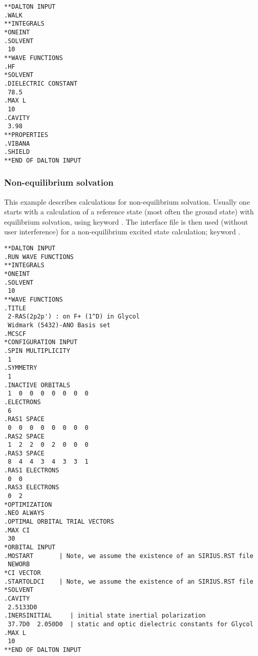 \begin{verbatim}
**DALTON INPUT
.WALK
**INTEGRALS
*ONEINT
.SOLVENT
 10
**WAVE FUNCTIONS
.HF
*SOLVENT
.DIELECTRIC CONSTANT
 78.5
.MAX L
 10
.CAVITY
 3.98
**PROPERTIES
.VIBANA
.SHIELD
**END OF DALTON INPUT
\end{verbatim}


\subsubsection{Non-equilibrium solvation}\label{sec:solvnoneqrsp}

This example describes calculations for non-equilibrium
solvation. Usually one starts with a calculation of a reference state
(most often the ground state) with equilibrium solvation, using
keyword . The interface file is then
used (without user interference) for
a non-equilibrium excited state calculation; keyword
.

\begin{verbatim}
**DALTON INPUT
.RUN WAVE FUNCTIONS
**INTEGRALS
*ONEINT
.SOLVENT
 10
**WAVE FUNCTIONS
.TITLE
 2-RAS(2p2p') : on F+ (1^D) in Glycol
 Widmark (5432)-ANO Basis set
.MCSCF
*CONFIGURATION INPUT
.SPIN MULTIPLICITY
 1
.SYMMETRY
 1
.INACTIVE ORBITALS
 1  0  0  0  0  0  0  0
.ELECTRONS
 6
.RAS1 SPACE
 0  0  0  0  0  0  0  0
.RAS2 SPACE
 1  2  2  0  2  0  0  0
.RAS3 SPACE
 8  4  4  3  4  3  3  1
.RAS1 ELECTRONS
 0  0
.RAS3 ELECTRONS
 0  2
*OPTIMIZATION
.NEO ALWAYS
.OPTIMAL ORBITAL TRIAL VECTORS
.MAX CI
 30
*ORBITAL INPUT
.MOSTART       | Note, we assume the existence of an SIRIUS.RST file
 NEWORB
*CI VECTOR
.STARTOLDCI    | Note, we assume the existence of an SIRIUS.RST file
*SOLVENT
.CAVITY
 2.5133D0
.INERSINITIAL     | initial state inertial polarization
 37.7D0  2.050D0  | static and optic dielectric constants for Glycol
.MAX L
 10
**END OF DALTON INPUT
\end{verbatim}
